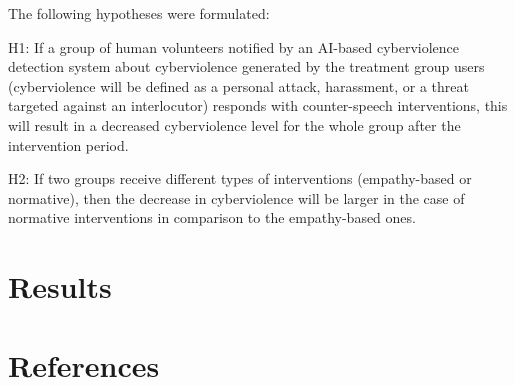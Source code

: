 \documentclass[
  10pt,
  dvipsnames,enabledeprecatedfontcommands]{scrartcl}
\begin{document}
The following hypotheses were formulated:

H1: If a group of human volunteers notified by an AI-based cyberviolence
detection system about cyberviolence generated by the treatment group
users (cyberviolence will be defined as a personal attack, harassment,
or a threat targeted against an interlocutor) responds with
counter-speech interventions, this will result in a decreased
cyberviolence level for the whole group after the intervention period.

H2: If two groups receive different types of interventions
(empathy-based or normative), then the decrease in cyberviolence will be
larger in the case of normative interventions in comparison to the
empathy-based ones.

\hypertarget{results}{%
\section{Results}\label{results}}

\hypertarget{references}{%
\section*{References}\label{references}}

\vspace{-3mm}
\end{document}

